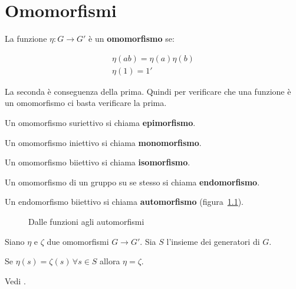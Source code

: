 \chapter{Omomorfismi}

La funzione $\eta: G \longrightarrow G'$ è un \textbf{omomorfismo} se:

\begin{gather}
	\label{eqn:omomorfismo_proprieta} \eta(ab) = \eta(a)\eta(b) \\
	\eta(1) = 1'
\end{gather}

La seconda è conseguenza della prima. Quindi per verificare che una funzione è un omomorfismo ci basta verificare la prima. 

Un omomorfismo suriettivo si chiama \textbf{epimorfismo}.

Un omomorfismo iniettivo si chiama \textbf{monomorfismo}.

Un omomorfismo biiettivo si chiama \textbf{isomorfismo}.

Un omomorfismo di un gruppo su se stesso si chiama \textbf{endomorfismo}.

Un endomorfismo biiettivo si chiama \textbf{automorfismo} (figura~\ref{fig:Omomorfismi_dalle_funzioni_agli_automorfismi}).

\begin{figure}[tp]
	\centering
	\caption{Dalle funzioni agli automorfismi}
	\label{fig:Omomorfismi_dalle_funzioni_agli_automorfismi}
\end{figure}

\begin{teorema}
	Siano $\eta$ e $\zeta$ due omomorfismi $G \longrightarrow G'$. Sia $S$ l'insieme dei generatori di $G$.
	
	Se $\eta(s) = \zeta(s) \,\forall s \in S$ allora $\eta = \zeta$.
\end{teorema}
\begin{dimostrazione}
	Vedi \cite[pag. 60]{jacobson}.
\end{dimostrazione}

